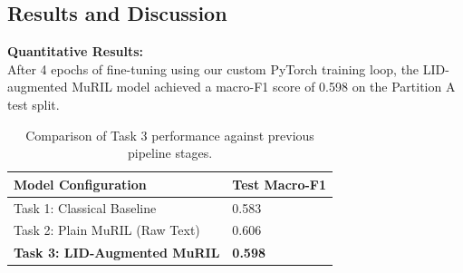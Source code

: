 \subsection*{Results and Discussion}

\textbf{Quantitative Results:} \\
After 4 epochs of fine-tuning using our custom PyTorch training loop, the LID-augmented MuRIL model achieved a macro-F1 score of 0.598 on the Partition A test split. 

\begin{table}[H]
    \centering
    \begin{tabular}{@{}ll@{}}
        \toprule
        \textbf{Model Configuration} & \textbf{Test Macro-F1} \\
        \midrule
        Task 1: Classical Baseline & 0.583 \\
        Task 2: Plain MuRIL (Raw Text) & 0.606 \\
        \textbf{Task 3: LID-Augmented MuRIL} & \textbf{0.598} \\
        \bottomrule
    \end{tabular}
    \caption{Comparison of Task 3 performance against previous pipeline stages.}
    \label{tab:task3_results}
\end{table}


